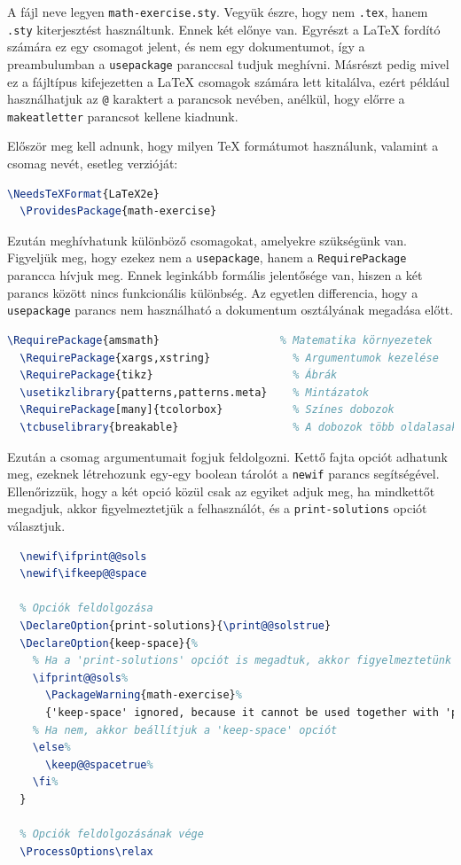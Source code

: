 A fájl neve legyen \texttt{math-exercise.sty}. Vegyük észre, hogy nem
\texttt{.tex}, hanem \texttt{.sty} kiterjesztést használtunk. Ennek két előnye
van. Egyrészt a \LaTeX{} fordító számára ez egy csomagot jelent, és nem egy
dokumentumot, így a preambulumban a \texttt{usepackage} paranccsal tudjuk
meghívni. Másrészt pedig mivel ez a fájltípus kifejezetten a \LaTeX{} csomagok
számára lett kitalálva, ezért például használhatjuk az \texttt{@} karaktert
a parancsok nevében, anélkül, hogy előrre a \texttt{makeatletter} parancsot
kellene kiadnunk.

Először meg kell adnunk, hogy milyen \TeX{} formátumot használunk, valamint
a csomag nevét, esetleg verzióját:

\begin{lstlisting}[language=tex,caption={Csomag információk}]
  \NeedsTeXFormat{LaTeX2e}
  \ProvidesPackage{math-exercise}
\end{lstlisting}

Ezután meghívhatunk különböző csomagokat, amelyekre szükségünk van. Figyeljük
meg, hogy ezekez nem a \texttt{usepackage}, hanem a \texttt{RequirePackage}
parancca hívjuk meg. Ennek leginkább formális jelentősége van, hiszen a két
parancs között nincs funkcionális különbség. Az egyetlen differencia, hogy
a \texttt{usepackage} parancs nem használható a dokumentum osztályának megadása
előtt.

\begin{lstlisting}[language=tex,caption={Csomagok meghívása}]
  \RequirePackage{amsmath}                   % Matematika környezetek
  \RequirePackage{xargs,xstring}             % Argumentumok kezelése
  \RequirePackage{tikz}                      % Ábrák
  \usetikzlibrary{patterns,patterns.meta}    % Mintázatok
  \RequirePackage[many]{tcolorbox}           % Színes dobozok
  \tcbuselibrary{breakable}                  % A dobozok több oldalasak is lehetnek
\end{lstlisting}

Ezután a csomag argumentumait fogjuk feldolgozni. Kettő fajta opciót adhatunk
meg, ezeknek létrehozunk egy-egy boolean tárolót a \texttt{newif} parancs
segítségével. Ellenőrizzük, hogy a két opció közül csak az egyiket adjuk meg,
ha mindkettőt megadjuk, akkor figyelmeztetjük a felhasználót, és a
\texttt{print-solutions} opciót választjuk.

\begin{lstlisting}[language=tex,caption={Opciók feldolgozása}]
  % Tárolók létrehozása
  \newif\ifprint@@sols
  \newif\ifkeep@@space

  % Opciók feldolgozása
  \DeclareOption{print-solutions}{\print@@solstrue}
  \DeclareOption{keep-space}{%
    % Ha a 'print-solutions' opciót is megadtuk, akkor figyelmeztetünk
    \ifprint@@sols%
      \PackageWarning{math-exercise}%
      {'keep-space' ignored, because it cannot be used together with 'print-solutions'}%
    % Ha nem, akkor beállítjuk a 'keep-space' opciót
    \else%
      \keep@@spacetrue%
    \fi%
  }

  % Opciók feldolgozásának vége
  \ProcessOptions\relax
\end{lstlisting}

